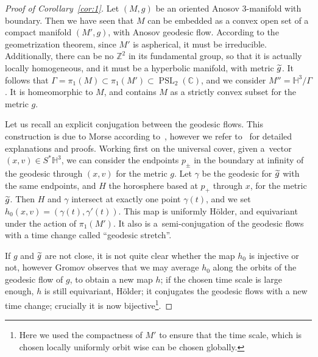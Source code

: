\documentclass[10pt]{amsart}
\theoremstyle{definition}\newtheorem{defi}[theo]{Definition}\newtheorem{rema}[theo]{Remark}\newtheorem{exam}[theo]{Example}\newtheorem{exem}[theo]{Example}\newtheorem{nota}[theo]{Notation}
\newcommand{\Z}{\mathbb{Z}}
\newcommand{\C}{\mathbb{C}}
\newcommand{\Hh}{\mathbb{H}}
\DeclareMathOperator{\PSL}{PSL}
\theoremstyle{plain}
\let\oldtilde\tilde
\renewcommand*{\tilde}[1]{\mathchoice{\widetilde{#1}}{\widetilde{#1}}{\oldtilde{#1}}{\oldtilde{#1}}}
\begin{document}
\begin{proof}[Proof of Corollary~\ref{cor:1}]
Let $(M,g)$ be an oriented Anosov 3-manifold with boundary. Then we have seen that $M$ can be embedded as a convex open set of a compact manifold $(M',g)$, with Anosov geodesic flow. According to the geometrization theorem, since $M'$ is aspherical, it must be irreducible. Additionally, there can be no $\Z^2$ in its fundamental group, so that it is actually locally homogeneous, and it must be a hyperbolic manifold, with metric $\tilde{g}$. It follows that $\Gamma=\pi_1(M)\subset \pi_1(M')\subset \PSL_2(\C)$, and we consider $M''= \Hh^3/\Gamma$. It is homeomorphic to $M$, and contains $M$ as a strictly convex subset for the metric $g$.

Let us recall an explicit conjugation between the geodesic flows. This construction is due to Morse according to~\cite{Gromov-00}, however we refer to~\cite[Appendix~B]{Guillarmou-Knieper-Lefeuvre} for detailed explanations and proofs. Working first on the universal cover, given a~vector $(x,v)\in S^\ast \Hh^3$, we can consider the endpoints $p_{\pm}$ in the boundary at infinity of the geodesic through $(x,v)$ for the metric $g$. Let ${\gamma}$ be the geodesic for $\tilde{g}$ with the same endpoints, and $H$ the horosphere based at $p_+$ through $x$, for the metric $\tilde{g}$. Then $H$ and $\gamma$ intersect at exactly one point $\gamma(t)$, and we set $h_0(x,v) = (\gamma(t),\gamma'(t))$. This map is uniformly H\"older, and equivariant under the action of $\pi_1(M')$. It also is a~semi-conjugation of the geodesic flows with a time change called ``geodesic stretch''.

If $g$ and $\tilde{g}$ are not close, it is not quite clear whether the map $h_0$ is injective or not, however Gromov observes that we may average $h_0$ along the orbits of the geodesic flow of $g$, to obtain a new map $h$; if the chosen time scale is large enough, $h$ is still equivariant, H\"older; it conjugates the geodesic flows with a new time change; crucially it is now bijective\footnote{Here we used the compactness of $M'$ to ensure that the time scale, which is chosen locally uniformly orbit wise can be chosen globally.}.



\end{proof}
\end{document}
